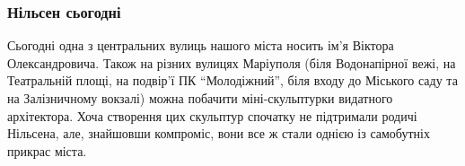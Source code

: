  
 
 
 
 

\subsubsection{Нільсен сьогодні}

Сьогодні одна з центральних вулиць нашого міста носить ім'я Віктора
Олександровича. Також на різних вулицях Маріуполя (біля Водонапірної вежі, на
Театральній площі, на подвір'ї ПК \enquote{Молодіжний}, біля входу до Міського саду та
на Залізничному вокзалі) можна побачити міні-скульптурки видатного
архітектора. Хоча створення цих скульптур спочатку не підтримали родичі
Нільсена, але, знайшовши компроміс, вони все ж стали однією із самобутніх
прикрас міста.

